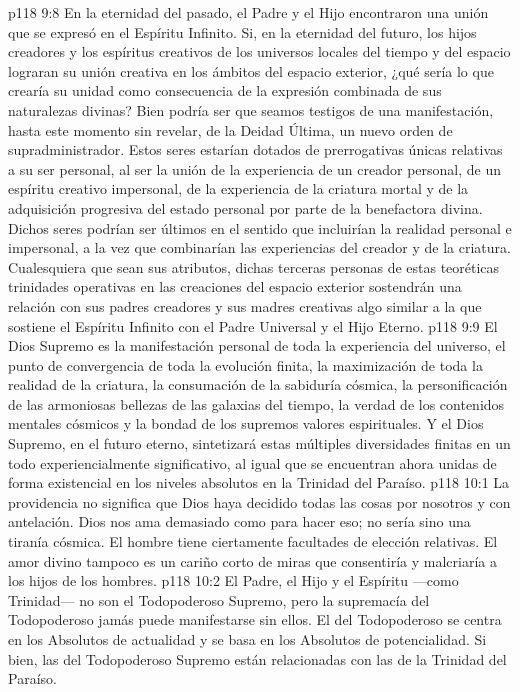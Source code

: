 \vs p118 9:8 En la eternidad del pasado, el Padre y el Hijo encontraron una unión que se expresó en el Espíritu Infinito. Si, en la eternidad del futuro, los hijos creadores y los espíritus creativos de los universos locales del tiempo y del espacio lograran su unión creativa en los ámbitos del espacio exterior, ¿qué sería lo que crearía su unidad como consecuencia de la expresión combinada de sus naturalezas divinas? Bien podría ser que seamos testigos de una manifestación, hasta este momento sin revelar, de la Deidad Última, un nuevo orden de supradministrador. Estos seres estarían dotados de prerrogativas únicas relativas a su ser personal, al ser la unión de la experiencia de un creador personal, de un espíritu creativo impersonal, de la experiencia de la criatura mortal y de la adquisición progresiva del estado personal por parte de la benefactora divina. Dichos seres podrían ser últimos en el sentido que incluirían la realidad personal e impersonal, a la vez que combinarían las experiencias del creador y de la criatura. Cualesquiera que sean sus atributos, dichas terceras personas de estas teoréticas trinidades operativas en las creaciones del espacio exterior sostendrán una relación con sus padres creadores y sus madres creativas algo similar a la que sostiene el Espíritu Infinito con el Padre Universal y el Hijo Eterno.
\vs p118 9:9 \pc El Dios Supremo es la manifestación personal de toda la experiencia del universo, el punto de convergencia de toda la evolución finita, la maximización de toda la realidad de la criatura, la consumación de la sabiduría cósmica, la personificación de las armoniosas bellezas de las galaxias del tiempo, la verdad de los contenidos mentales cósmicos y la bondad de los supremos valores espirituales. Y el Dios Supremo, en el futuro eterno, sintetizará estas múltiples diversidades finitas en un todo experiencialmente significativo, al igual que se encuentran ahora unidas de forma existencial en los niveles absolutos en la Trinidad del Paraíso.
\vs p118 10:1 La providencia no significa que Dios haya decidido todas las cosas por nosotros y con antelación. Dios nos ama demasiado como para hacer eso; no sería sino una tiranía cósmica. El hombre tiene ciertamente facultades de elección relativas. El amor divino tampoco es un cariño corto de miras que consentiría y malcriaría a los hijos de los hombres.
\vs p118 10:2 \pc El Padre, el Hijo y el Espíritu ---como Trinidad--- no son el Todopoderoso Supremo, pero la supremacía del Todopoderoso jamás puede manifestarse sin ellos. El  del Todopoderoso se centra en los Absolutos de actualidad y se basa en los Absolutos de potencialidad. Si bien, las  del Todopoderoso Supremo están relacionadas con las de la Trinidad del Paraíso.
